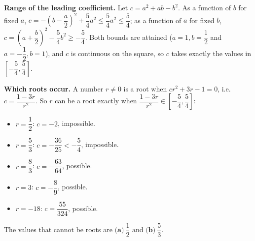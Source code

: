 \textbf{Range of the leading coefficient.} Let $c=a^2+ab-b^2$. As a function of $b$ for fixed $a$, $c=-\left(b-\dfrac {a}{2}\right)^2+\dfrac{5}{4}a^2\le\dfrac{5}{4}a^2\le\dfrac{5}{4}$; as a function of $a$ for fixed $b$, $c=\left(a+\dfrac {b}{2}\right)^2-\dfrac{5}{4}b^2\ge-\dfrac{5}{4}$. Both bounds are attained ($a=1,b=\dfrac{1}{2}$ and $a=-\dfrac{1}{2},b=1$), and $c$ is continuous on the square, so $c$ takes exactly the values in $\left[-\dfrac{5}{4},\dfrac{5}{4}\right]$.

\textbf{Which roots occur.} A number $r\ne0$ is a root when $cr^2+3r-1=0$, i.e.\ $c=\dfrac{1-3r}{r^2}$. So $r$ can be a root exactly when $\dfrac{1-3r}{r^2}\in\left[-\dfrac{5}{4},\dfrac{5}{4}\right]$:
\begin{itemize}
\item $r=\dfrac{1}{2}$: $c=-2$, impossible.
\item $r=\dfrac{5}{3}$: $c=-\dfrac{36}{25}<-\dfrac{5}{4}$, impossible.
\item $r=\dfrac{8}{3}$: $c=-\dfrac{63}{64}$, possible.
\item $r=3$: $c=-\dfrac{8}{9}$, possible.
\item $r=-18$: $c=\dfrac{55}{324}$, possible.
\end{itemize}
The values that cannot be roots are $\boxed{\textbf{(a)}\ \dfrac{1}{2}\text{ and }\textbf{(b)}\ \dfrac{5}{3}}$.

